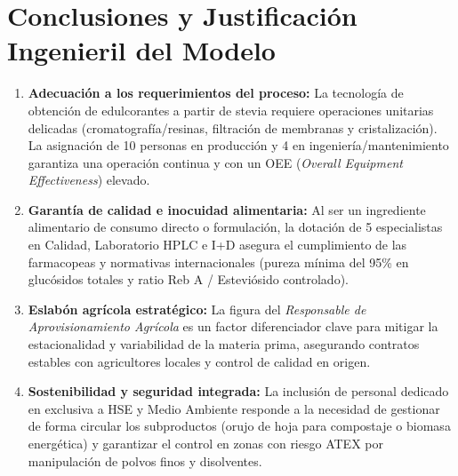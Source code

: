 \section{Conclusiones y Justificación Ingenieril del Modelo}

\begin{enumerate}
    \item \textbf{Adecuación a los requerimientos del proceso:} La tecnología de obtención de edulcorantes a partir de stevia requiere operaciones unitarias delicadas (cromatografía/resinas, filtración de membranas y cristalización). La asignación de 10 personas en producción y 4 en ingeniería/mantenimiento garantiza una operación continua y con un OEE (\textit{Overall Equipment Effectiveness}) elevado.
    \item \textbf{Garantía de calidad e inocuidad alimentaria:} Al ser un ingrediente alimentario de consumo directo o formulación, la dotación de 5 especialistas en Calidad, Laboratorio HPLC e I+D asegura el cumplimiento de las farmacopeas y normativas internacionales (pureza mínima del 95\% en glucósidos totales y ratio Reb A / Esteviósido controlado).
    \item \textbf{Eslabón agrícola estratégico:} La figura del \textit{Responsable de Aprovisionamiento Agrícola} es un factor diferenciador clave para mitigar la estacionalidad y variabilidad de la materia prima, asegurando contratos estables con agricultores locales y control de calidad en origen.
    \item \textbf{Sostenibilidad y seguridad integrada:} La inclusión de personal dedicado en exclusiva a HSE y Medio Ambiente responde a la necesidad de gestionar de forma circular los subproductos (orujo de hoja para compostaje o biomasa energética) y garantizar el control en zonas con riesgo ATEX por manipulación de polvos finos y disolventes.
\end{enumerate}